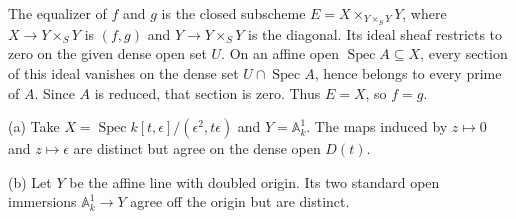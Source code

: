 The equalizer of $f$ and $g$ is the closed subscheme $E=X\times_{Y\times_SY}Y$, where $X\to Y\times_SY$ is $(f,g)$ and $Y\to Y\times_SY$ is the diagonal. Its ideal sheaf restricts to zero on the given dense open set $U$. On an affine open $\operatorname{Spec}A\subseteq X$, every section of this ideal vanishes on the dense set $U\cap\operatorname{Spec}A$, hence belongs to every prime of $A$. Since $A$ is reduced, that section is zero. Thus $E=X$, so $f=g$.

(a) Take $X=\operatorname{Spec}k[t,\epsilon]/(\epsilon^2,t\epsilon)$ and $Y=\mathbb A_k^1$. The maps induced by $z\mapsto0$ and $z\mapsto\epsilon$ are distinct but agree on the dense open $D(t)$.

(b) Let $Y$ be the affine line with doubled origin. Its two standard open immersions $\mathbb A_k^1\to Y$ agree off the origin but are distinct.
